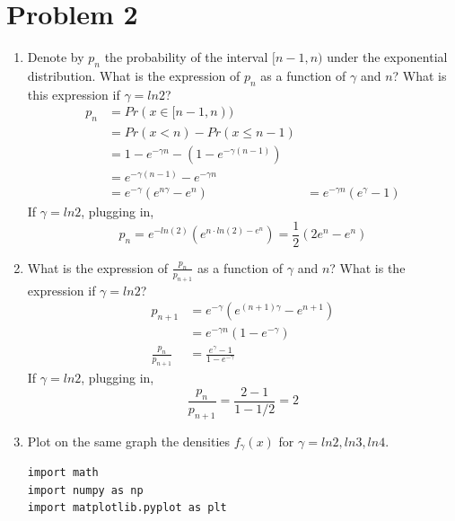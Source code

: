 \documentclass[preprint,12pt]{elsarticle}
\begin{document}
    \section{Problem 2}
    \begin{enumerate}
        \item Denote by $p_n$ the probability of the interval $[n-1, n)$ 
        under the exponential distribution. What is the expression of 
        $p_n$ as a function of $\gamma$ and $n$? What is this expression 
        if $\gamma=ln2$?
        \begin{align*}
            p_n     &= Pr(x\in [n-1, n)) \\
                    &= Pr(x<n) - Pr(x\leq n-1) \\
                    &= 1 - e^{-\gamma n} - (1 - e^{-\gamma (n-1)}) \\
                    &= e^{-\gamma (n-1)} - e^{-\gamma n} \\
                    &= e^{-\gamma}(e^{n\gamma} - e^n)
                    &= e^{-\gamma n}(e^{\gamma} - 1)
        \end{align*}
        If $\gamma=ln2$, plugging in,
        \begin{equation*}
            p_n = e^{-ln(2)}(e^{n\cdot ln(2) - e^n}) = \frac{1}{2}(2e^n - e^n)
        \end{equation*}

        \item What is the expression of $\frac{p_n}{p_{n+1}}$ as a function
        of $\gamma$ and $n$? What is the expression if $\gamma=ln2$?
        \begin{align*}
            p_{n+1} &= e^{-\gamma}(e^{(n+1)\gamma} - e^{n+1}) \\
                    &= e^{-\gamma n}(1 - e^{-\gamma}) \\
            \frac{p_n}{p_{n+1}}     &= \frac{e^{\gamma} - 1}{1 - e^{-\gamma}} 
        \end{align*}
        If $\gamma=ln2$, plugging in,
        \begin{equation*}
            \frac{p_n}{p_{n+1}} = \frac{2 - 1}{1 - 1/2} = 2 
        \end{equation*}

        \item Plot on the same graph the densities $f_{\gamma}(x)$ for 
        $\gamma=ln2,ln3,ln4$.
        \begin{lstlisting}
import math
import numpy as np
import matplotlib.pyplot as plt


\end{lstlisting}
\end{enumerate}
\end{document}
